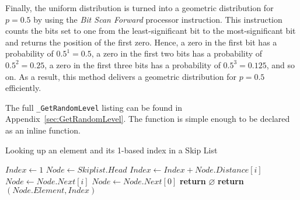 Finally, the uniform distribution is turned into a geometric distribution for $p = 0.5$ by using the \emph{Bit Scan Forward} processor instruction.
This instruction counts the bits set to one from the least-significant bit to the most-significant bit and returns the position of the first zero.
Hence, a zero in the first bit has a probability of $0.5^1 = 0.5$, a zero in the first two bits has a probability of $0.5^2 = 0.25$, a zero in the first three bits has a probability of $0.5^3 = 0.125$, and so on.
As a result, this method delivers a geometric distribution for $p = 0.5$ efficiently.

The full \texttt{\_GetRandomLevel} listing can be found in Appendix~\ref{sec:GetRandomLevel}.
The function is simple enough to be declared as an inline function.


\begin{algorithm}[t]
	\caption{Looking up an element and its 1-based index in a Skip List}
	\label{alg:LookupElementSkiplist}
	\begin{algorithmic}[1]
			\State $Index \gets 1$
			\State $Node \gets Skiplist.Head$
			\newline
					\State $Index \gets Index + Node.Distance[i]$
					\State $Node \gets Node.Next[i]$
				\EndWhile
			\EndFor
			\newline
			\State $Node \gets Node.Next[0]$
				\State \textbf{return} $\varnothing$
			\EndIf
			\newline
			\State \textbf{return} $(Node.Element, Index)$
		\EndProcedure
	\end{algorithmic}
\end{algorithm}
